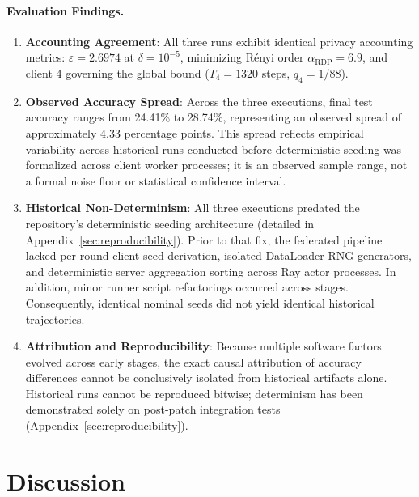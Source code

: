 \documentclass[11pt,a4paper]{article}
\begin{document}
\paragraph{Evaluation Findings.}
\begin{enumerate}
    \item \textbf{Accounting Agreement}: All three runs exhibit identical privacy accounting metrics: $\varepsilon = 2.6974$ at $\delta=10^{-5}$, minimizing Rényi order $\alpha_{\text{RDP}} = 6.9$, and client 4 governing the global bound ($T_4 = 1320$ steps, $q_4 = 1/88$).
    \item \textbf{Observed Accuracy Spread}: Across the three executions, final test accuracy ranges from 24.41\% to 28.74\%, representing an observed spread of approximately 4.33 percentage points. This spread reflects empirical variability across historical runs conducted before deterministic seeding was formalized across client worker processes; it is an observed sample range, not a formal noise floor or statistical confidence interval.
    \item \textbf{Historical Non-Determinism}: All three executions predated the repository's deterministic seeding architecture (detailed in Appendix~\ref{sec:reproducibility}). Prior to that fix, the federated pipeline lacked per-round client seed derivation, isolated DataLoader RNG generators, and deterministic server aggregation sorting across Ray actor processes. In addition, minor runner script refactorings occurred across stages. Consequently, identical nominal seeds did not yield identical historical trajectories.
    \item \textbf{Attribution and Reproducibility}: Because multiple software factors evolved across early stages, the exact causal attribution of accuracy differences cannot be conclusively isolated from historical artifacts alone. Historical runs cannot be reproduced bitwise; determinism has been demonstrated solely on post-patch integration tests (Appendix~\ref{sec:reproducibility}).
\end{enumerate}

\section{Discussion}
\end{document}
